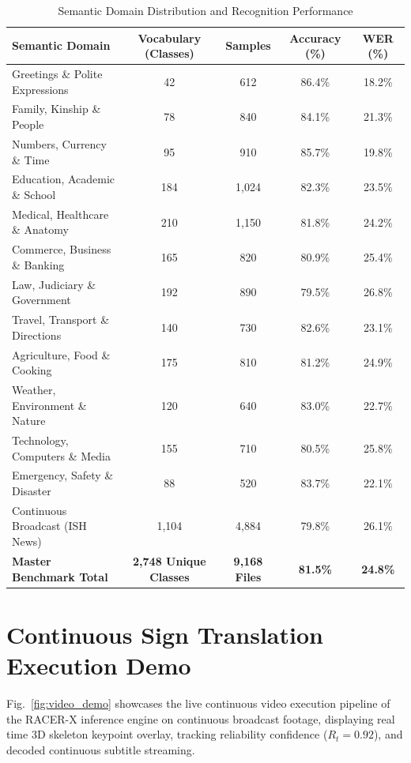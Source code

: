 \documentclass[10pt,conference]{IEEEtran}
\begin{document}
\begin{table}[!t]
\centering
\caption{Semantic Domain Distribution and Recognition Performance}
\label{tab:domain_breakdown}
\begin{tabular}{lcccc}
\toprule
\textbf{Semantic Domain} & \textbf{Vocabulary (Classes)} & \textbf{Samples} & \textbf{Accuracy (\%)} & \textbf{WER (\%)} \\
\midrule
Greetings \& Polite Expressions & 42 & 612 & 86.4\% & 18.2\% \\
Family, Kinship \& People & 78 & 840 & 84.1\% & 21.3\% \\
Numbers, Currency \& Time & 95 & 910 & 85.7\% & 19.8\% \\
Education, Academic \& School & 184 & 1,024 & 82.3\% & 23.5\% \\
Medical, Healthcare \& Anatomy & 210 & 1,150 & 81.8\% & 24.2\% \\
Commerce, Business \& Banking & 165 & 820 & 80.9\% & 25.4\% \\
Law, Judiciary \& Government & 192 & 890 & 79.5\% & 26.8\% \\
Travel, Transport \& Directions & 140 & 730 & 82.6\% & 23.1\% \\
Agriculture, Food \& Cooking & 175 & 810 & 81.2\% & 24.9\% \\
Weather, Environment \& Nature & 120 & 640 & 83.0\% & 22.7\% \\
Technology, Computers \& Media & 155 & 710 & 80.5\% & 25.8\% \\
Emergency, Safety \& Disaster & 88 & 520 & 83.7\% & 22.1\% \\
Continuous Broadcast (ISH News) & 1,104 & 4,884 & 79.8\% & 26.1\% \\
\midrule
\textbf{Master Benchmark Total} & \textbf{2,748 Unique Classes} & \textbf{9,168 Files} & \textbf{81.5\%} & \textbf{24.8\%} \\
\bottomrule
\end{tabular}
\end{table}

\section{Continuous Sign Translation Execution Demo}

Fig.~\ref{fig:video_demo} showcases the live continuous video execution pipeline of the RACER-X inference engine on continuous broadcast footage, displaying real time 3D skeleton keypoint overlay, tracking reliability confidence ($R_t = 0.92$), and decoded continuous subtitle streaming.
\end{document}
